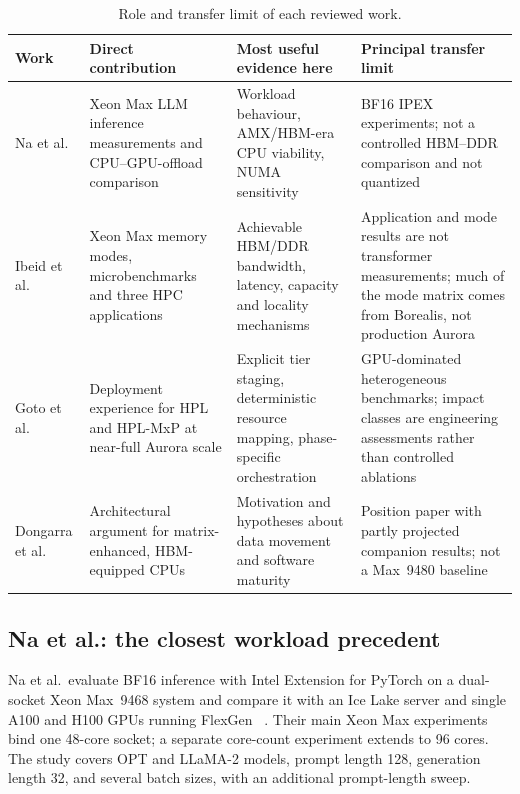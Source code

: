 \begin{table}[htbp]
\centering
\small
\tabsetup
\caption{Role and transfer limit of each reviewed work.}
\label{tab:corpus-roles}
\begin{tabularx}{\textwidth}{@{}P{2.55cm}YYP{3.35cm}@{}}
\toprule
\headrow
\textbf{Work} & \textbf{Direct contribution} &
\textbf{Most useful evidence here} & \textbf{Principal transfer limit} \\
\midrule
Na et al.\ \cite{na2024llmcpu}
& Xeon Max LLM inference measurements and CPU--GPU-offload comparison
& Workload behaviour, AMX/HBM-era CPU viability, NUMA sensitivity
& BF16 IPEX experiments; not a controlled HBM--DDR comparison and not
  quantized \lcpp{} \\
\addlinespace
Ibeid et al.\ \cite{ibeid2025aurora}
& Xeon Max memory modes, microbenchmarks and three HPC applications
& Achievable HBM/DDR bandwidth, latency, capacity and locality mechanisms
& Application and mode results are not transformer measurements; much
  of the mode matrix comes from Borealis, not production Aurora \\
\addlinespace
Goto et al.\ \cite{goto2026aurorahpl}
& Deployment experience for HPL and HPL-MxP at near-full Aurora scale
& Explicit tier staging, deterministic resource mapping, phase-specific
  orchestration
& GPU-dominated heterogeneous benchmarks; impact classes are engineering
  assessments rather than controlled ablations \\
\addlinespace
Dongarra et al.\ \cite{dongarra2026gpus}
& Architectural argument for matrix-enhanced, HBM-equipped CPUs
& Motivation and hypotheses about data movement and software maturity
& Position paper with partly projected companion results; not a Max~9480
  baseline \\
\bottomrule
\end{tabularx}
\end{table}

\subsection{Na et al.: the closest workload precedent}
\label{sec:na-critical}

Na et al.\ evaluate BF16 inference with Intel Extension for PyTorch on
a dual-socket Xeon Max~9468 system and compare it with an Ice Lake
server and single A100 and H100 GPUs running FlexGen
~\cite{na2024llmcpu}.  Their main Xeon Max experiments bind one
48-core socket; a separate core-count experiment extends to 96 cores.
The study covers OPT and LLaMA-2 models, prompt length 128, generation
length 32, and several batch sizes, with an additional prompt-length
sweep.

